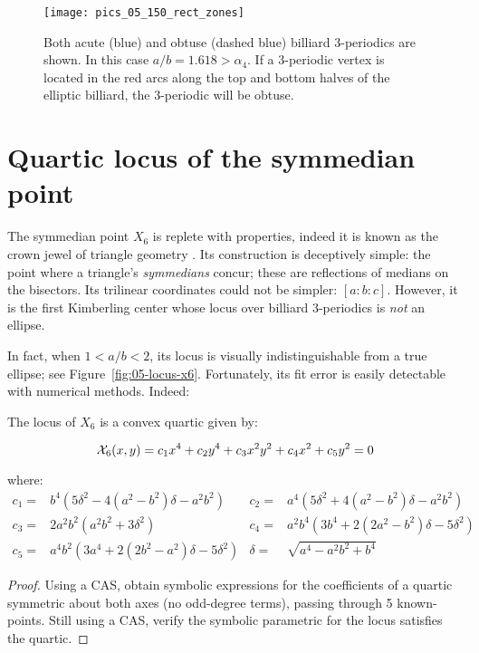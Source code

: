 \begin{figure}
    \centering
    \texttt{[image: pics\_05\_150\_rect\_zones]}
    \caption{Both acute (blue) and obtuse (dashed blue) billiard 3-periodics are shown. In this case $a/b=1.618>\alpha_4$. If a 3-periodic vertex is located in the red arcs along the top and bottom halves of the elliptic billiard, the 3-periodic will be obtuse.}
\label{fig:05-obtuse-zones}
\end{figure}


\section{Quartic locus of the symmedian point }
\label{sec:symmedian}

The symmedian point $X_6$ is replete with properties, indeed it is known as the crown jewel of triangle geometry \cite[Symmedian Point]{mw}. Its construction is deceptively simple: the point where a triangle's {\em symmedians} concur; these are reflections of medians on the bisectors. Its trilinear coordinates could not be simpler: $[a:b:c]$. However, it is the first Kimberling center whose locus over billiard 3-periodics is {\em not} an ellipse. 

In fact, when $1<a/b<2$, its locus is visually indistinguishable from a true ellipse; see Figure~\ref{fig:05-locus-x6}. Fortunately, its fit error is easily detectable with numerical methods. Indeed:

\begin{proposition}
The locus of $X_6$ is a convex quartic given by:

\begin{equation*}
  \mathcal{X}_6(x,y)=c_1 x^4+c_2 y^4+c_3 x^2 y^2+ c_4 x^2 + c_5 y^2 = 0
\end{equation*}

\noindent where:
$$
\begin{array}{rlrl}
c_1=&b^4(5\delta^2-4(a^2-b^2)\delta -a^2 b^2)&c_2=&a^4(5\delta^2+4(a^2-b^2)\delta-a^2b^2) \\
c_3=&2a^2 b^2(a^2 b^2+3\delta^2)&c_4=&a^2 b^4(3 b^4+2(2 a^2-b^2)\delta-5\delta^2)\\
c_5=&a^4 b^2(3 a^4+2(2 b^2-a^2)\delta-5\delta^2)&\delta=&\sqrt{a^4-a^2 b^2+b^4}
\end{array}
$$
\end{proposition}

\begin{proof}
Using a CAS, obtain symbolic expressions for the coefficients of a quartic symmetric about both axes (no odd-degree terms), passing through 5 known-points. Still using a CAS, verify the symbolic parametric for the locus satisfies the quartic.
\end{proof}

